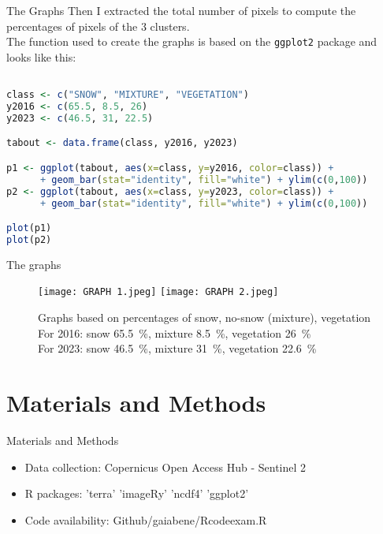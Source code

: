 \documentclass{beamer}
\begin{document}
\begin{frame}[fragile]{The Graphs}
    Then I extracted the total number of pixels to compute the percentages of pixels of the 3 clusters. \\
    The function used to create the graphs is based on the
    \texttt{ggplot2} package and looks like this:\\

\begin{lstlisting}[language=R, basicstyle=\tiny]

class <- c("SNOW", "MIXTURE", "VEGETATION")
y2016 <- c(65.5, 8.5, 26)
y2023 <- c(46.5, 31, 22.5)

tabout <- data.frame(class, y2016, y2023)

p1 <- ggplot(tabout, aes(x=class, y=y2016, color=class)) + 
      + geom_bar(stat="identity", fill="white") + ylim(c(0,100))
p2 <- ggplot(tabout, aes(x=class, y=y2023, color=class)) + 
      + geom_bar(stat="identity", fill="white") + ylim(c(0,100))

plot(p1)
plot(p2)

\end{lstlisting}

\end{frame}
  

\begin{frame}{The graphs}
\begin{figure}
    \centering
    \texttt{[image: GRAPH 1.jpeg]} 
    \texttt{[image: GRAPH 2.jpeg]}
    \caption{Graphs based on percentages of snow, no-snow (mixture), vegetation\\
    \small  For 2016: snow \SI{65.5}{\percent}, mixture \SI{8.5}{\percent}, vegetation \SI{26}{\percent}\\
    \small For 2023: snow \SI{46.5}{\percent}, mixture \SI{31}{\percent}, vegetation \SI{22.6}{\percent} }
  
\end{figure}

\end{frame}

\section{Materials and Methods}
\begin{frame}{Materials and Methods}
\begin{itemize}
    \item Data collection: Copernicus Open Access Hub - Sentinel 2
    \item R packages: 'terra' 'imageRy' 'ncdf4' 'ggplot2'
    \item Code availability: Github/gaiabene/R\textunderscore code\textunderscore exam.R
    \end{itemize}

\end{frame}
\end{document}
